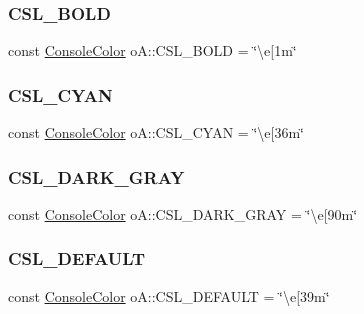 \subsubsection{\texorpdfstring{C\+S\+L\+\_\+\+B\+O\+LD}{CSL\_BOLD}}
{\footnotesize\ttfamily const \mbox{\hyperlink{namespaceo_a_a747e07c1977a29f3e1d38683043ec927}{Console\+Color}} o\+A\+::\+C\+S\+L\+\_\+\+B\+O\+LD = \char`\"{}\textbackslash{}e\mbox{[}1m\char`\"{}\hspace{0.3cm}{\ttfamily [inline]}}

\mbox{\label{namespaceo_a_a10ac82cded93f3765e06b721f678ecd6}} 
\subsubsection{\texorpdfstring{C\+S\+L\+\_\+\+C\+Y\+AN}{CSL\_CYAN}}
{\footnotesize\ttfamily const \mbox{\hyperlink{namespaceo_a_a747e07c1977a29f3e1d38683043ec927}{Console\+Color}} o\+A\+::\+C\+S\+L\+\_\+\+C\+Y\+AN = \char`\"{}\textbackslash{}e\mbox{[}36m\char`\"{}\hspace{0.3cm}{\ttfamily [inline]}}

\mbox{\label{namespaceo_a_a928cf177e35d3f1dfb86f9efeb29c749}} 
\subsubsection{\texorpdfstring{C\+S\+L\+\_\+\+D\+A\+R\+K\+\_\+\+G\+R\+AY}{CSL\_DARK\_GRAY}}
{\footnotesize\ttfamily const \mbox{\hyperlink{namespaceo_a_a747e07c1977a29f3e1d38683043ec927}{Console\+Color}} o\+A\+::\+C\+S\+L\+\_\+\+D\+A\+R\+K\+\_\+\+G\+R\+AY = \char`\"{}\textbackslash{}e\mbox{[}90m\char`\"{}\hspace{0.3cm}{\ttfamily [inline]}}

\mbox{\label{namespaceo_a_aadeb6b59aa5701c44f9011d3e313851f}} 
\subsubsection{\texorpdfstring{C\+S\+L\+\_\+\+D\+E\+F\+A\+U\+LT}{CSL\_DEFAULT}}
{\footnotesize\ttfamily const \mbox{\hyperlink{namespaceo_a_a747e07c1977a29f3e1d38683043ec927}{Console\+Color}} o\+A\+::\+C\+S\+L\+\_\+\+D\+E\+F\+A\+U\+LT = \char`\"{}\textbackslash{}e\mbox{[}39m\char`\"{}\hspace{0.3cm}{\ttfamily [inline]}}

